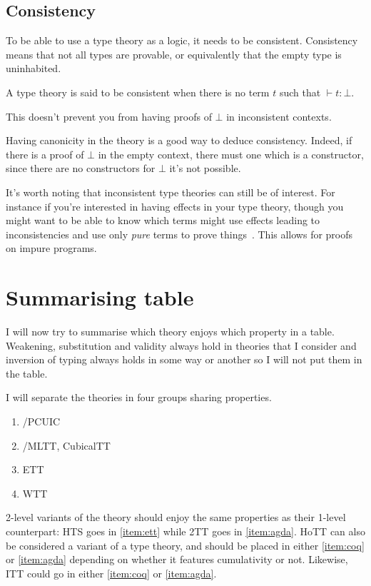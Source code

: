 \subsection{Consistency}

To be able to use a type theory as a logic, it needs to be consistent.
Consistency means that not all types are provable, or equivalently that
the empty type is uninhabited.

\begin{definition}[Consistency]
  A type theory is said to be consistent when there is no term \(t\) such that
  \(\vdash t : \bot\).
\end{definition}

This doesn't prevent you from having proofs of \(\bot\) in inconsistent
contexts.

Having canonicity in the theory is a good way to deduce consistency.
Indeed, if there is a proof of \(\bot\) in the empty context, there must
one which is a constructor, since there are no constructors for \(\bot\)
it's not possible.

It's worth noting that inconsistent type theories can still be of interest.
For instance if you're interested in having effects in your type theory,
though you might want to be able to know which terms might use effects leading
to inconsistencies and use only \emph{pure} terms to prove
things~.
This allows for proofs on impure programs.

\section{Summarising table}

I will now try to summarise which theory enjoys which property in a table.
Weakening, substitution and validity always hold in theories that I consider and
inversion of typing always holds in some way or another so I will not put them
in the table.

I will separate the theories in four groups sharing properties.
\begin{enumerate}[label=(\Alph*)]
  \item \label{item:coq} \Coq/\acrshort{PCUIC}
  \item \label{item:agda} \Agda/\acrshort{MLTT}, \acrshort{CubicalTT}
  \item \label{item:ett} \acrshort{ETT}
  \item \label{item:wtt} \acrshort{WTT}
\end{enumerate}
2-level variants of the theory should enjoy the same properties as their 1-level
counterpart: \acrshort{HTS} goes in \ref{item:ett} while \acrshort{2TT} goes
in \ref{item:agda}.
\acrshort{HoTT} can also be considered a variant of a type theory, and should be
placed in either \ref{item:coq} or \ref{item:agda} depending on whether it
features cumulativity or not.
Likewise, \acrshort{ITT} could go in either \ref{item:coq} or \ref{item:agda}.

